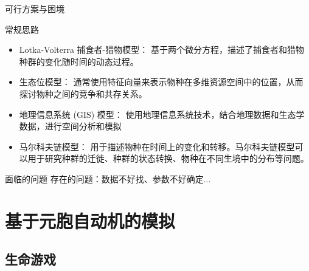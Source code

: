 \documentclass{beamer}
\begin{document}
\begin{frame}{可行方案与困境}
\begin{block}{常规思路}
\begin{itemize}
    \item Lotka-Volterra 捕食者-猎物模型：
        基于两个微分方程，描述了捕食者和猎物种群的变化随时间的动态过程。
    \item 生态位模型：
        通常使用特征向量来表示物种在多维资源空间中的位置，从而探讨物种之间的竞争和共存关系。
    \item 地理信息系统 (GIS) 模型：
        使用地理信息系统技术，结合地理数据和生态学数据，进行空间分析和模拟
    \item 马尔科夫链模型：
        用于描述物种在时间上的变化和转移。马尔科夫链模型可以用于研究种群的迁徙、种群的状态转换、物种在不同生境中的分布等问题。
\end{itemize}
\end{block}

\begin{block}{面临的问题}
    存在的问题：数据不好找、参数不好确定...
\end{block}

\end{frame}


\section{基于元胞自动机的模拟}

\subsection{生命游戏}
\end{document}

